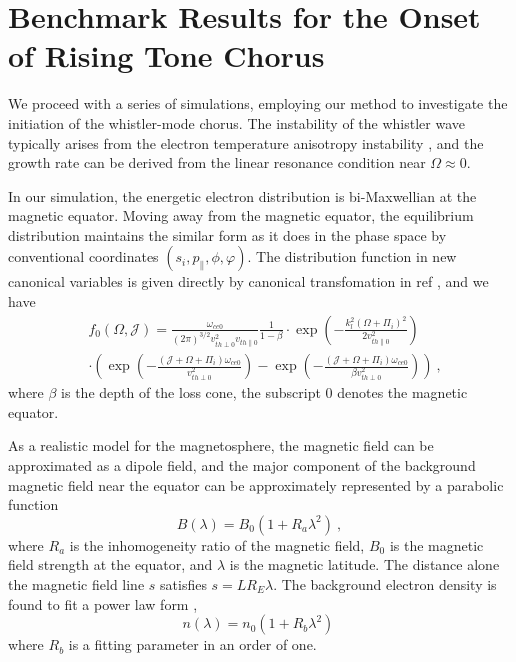 \section{Benchmark Results for the Onset of Rising Tone Chorus}
\label{sec:code}
We proceed with a series of simulations, employing our method to investigate the initiation of the whistler-mode chorus. The instability of the whistler wave typically arises from the electron temperature anisotropy instability \cite{kennel1966a,kennel1966b}, and the growth rate can be derived from the linear resonance condition near $\Omega \approx 0$.

In our simulation, the energetic electron distribution is bi-Maxwellian at the magnetic equator. 
Moving away from the magnetic equator, the equilibrium distribution maintains the similar form as it does in the phase space by conventional coordinates $(s_i, p_\|, \phi, \varphi)$. The distribution function in new canonical variables is given directly by canonical transfomation in ref \cite{}, and we have 
\begin{equation}
    \begin{aligned}
        & f_{0}(\Omega, \mathcal{J}) =\frac{\omega_{c e 0}}{(2 \pi)^{3 / 2} v_{t h \perp 0}^2 v_{t h \| 0}} \frac{1}{1-\beta} \cdot \exp \left(-\frac{k_l^2(\Omega+\Pi_i)^2}{2 v_{t h \| 0}^2}\right) \\
        &\cdot\left(\exp \left(-\frac{(\mathcal{J}+\Omega+\Pi_i) \omega_{c e 0}}{v_{t h \perp 0}^2}\right)-\exp \left(-\frac{(\mathcal{J}+\Omega+\Pi_i) \omega_{c e 0}}{\beta v_{t h \perp 0}^2}\right)\right)~,
        \end{aligned}
\end{equation}
where $\beta$ is the depth of the loss cone, the subscript $0$ denotes the magnetic equator.

As a realistic model for the magnetosphere, the magnetic field can be approximated as a dipole field, and the major component of the background magnetic field near the equator can be approximately represented by a parabolic function \cite{tao_numerical_2014}
\begin{equation}
    B(\lambda) = B_0(1+ R_a \lambda ^2)~,
\end{equation}
where $R_a$ is the inhomogeneity ratio of the magnetic field, $B_0$ is the magnetic field strength at the equator, and $\lambda$ is the magnetic latitude. The distance alone the magnetic field line $s$ satisfies $s = L R_E \lambda$.
The background electron density is found to fit a power law form \cite{denton2004},
\begin{equation}
    n(\lambda) = n_0 (1+R_b \lambda^2)~
\end{equation}
where $R_b$ is a fitting parameter in an order of one.

